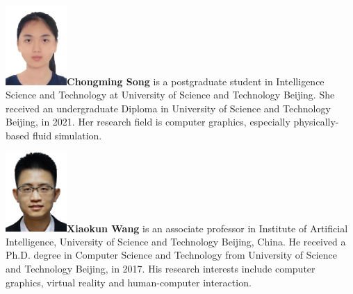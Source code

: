 \documentclass[VANCOUVER,STIX1COL]{WileyNJD-v2}
\providecommand{\DIFaddbegin}{} %
\providecommand{\DIFaddend}{} %
\providecommand{\DIFdelbegin}{} %
\providecommand{\DIFdelend}{} %
\begin{document}
\vspace{7ex}

\DIFdelbegin %
\DIFdelend \DIFaddbegin \begin{biography}{\includegraphics[width=66pt,height=86pt]{VANCOUVER/figure/photos/ChongmingSong.JPG}}{\textbf{Chongming Song} is a postgraduate student in Intelligence Science and Technology at University of Science and Technology Beijing. She received an undergraduate Diploma in University of Science and Technology Beijing, in 2021. Her research field is computer graphics, especially physically-based fluid simulation.}
\DIFaddend \end{biography}

\vspace{7ex}

\DIFdelbegin %
\DIFdelend \DIFaddbegin \begin{biography}{\includegraphics[width=66pt,height=86pt]{VANCOUVER/figure/photos/XiaokunWang.jpg}}{\textbf{Xiaokun Wang} is an associate professor in Institute of Artificial Intelligence, University of Science and Technology Beijing, China. He received a Ph.D. degree in Computer Science and Technology from University of Science and Technology Beijing, in 2017. His research interests include computer graphics, virtual reality and human-computer interaction.}
\DIFaddend \end{biography}
\end{document}
